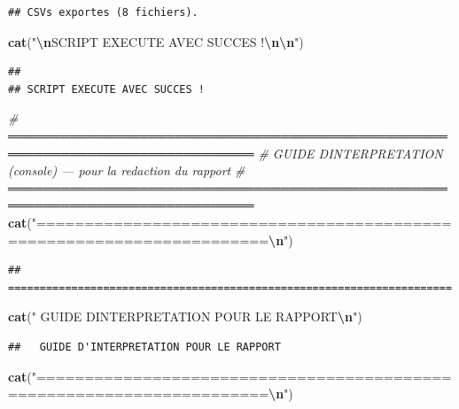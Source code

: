 \documentclass[
]{article}
\newenvironment{Shaded}{\begin{snugshade}}{\end{snugshade}}
\newcommand{\CommentTok}[1]{\textcolor[rgb]{0.56,0.35,0.01}{\textit{#1}}}
\newcommand{\FunctionTok}[1]{\textcolor[rgb]{0.13,0.29,0.53}{\textbf{#1}}}
\newcommand{\NormalTok}[1]{#1}
\newcommand{\SpecialCharTok}[1]{\textcolor[rgb]{0.81,0.36,0.00}{\textbf{#1}}}
\newcommand{\StringTok}[1]{\textcolor[rgb]{0.31,0.60,0.02}{#1}}
\begin{document}
\begin{verbatim}
## CSVs exportes (8 fichiers).
\end{verbatim}

\begin{Shaded}
\begin{Highlighting}[]
\FunctionTok{cat}\NormalTok{(}\StringTok{"}\SpecialCharTok{\textbackslash{}n}\StringTok{SCRIPT EXECUTE AVEC SUCCES !}\SpecialCharTok{\textbackslash{}n\textbackslash{}n}\StringTok{"}\NormalTok{)}
\end{Highlighting}
\end{Shaded}

\begin{verbatim}
## 
## SCRIPT EXECUTE AVEC SUCCES !
\end{verbatim}

\begin{Shaded}
\begin{Highlighting}[]
\CommentTok{\# ══════════════════════════════════════════════════════════════════════════════}
\CommentTok{\#  GUIDE D\textquotesingle{}INTERPRETATION (console) — pour la redaction du rapport}
\CommentTok{\# ══════════════════════════════════════════════════════════════════════════════}
\FunctionTok{cat}\NormalTok{(}\StringTok{"======================================================================}\SpecialCharTok{\textbackslash{}n}\StringTok{"}\NormalTok{)}
\end{Highlighting}
\end{Shaded}

\begin{verbatim}
## ======================================================================
\end{verbatim}

\begin{Shaded}
\begin{Highlighting}[]
\FunctionTok{cat}\NormalTok{(}\StringTok{"  GUIDE D\textquotesingle{}INTERPRETATION POUR LE RAPPORT}\SpecialCharTok{\textbackslash{}n}\StringTok{"}\NormalTok{)}
\end{Highlighting}
\end{Shaded}

\begin{verbatim}
##   GUIDE D'INTERPRETATION POUR LE RAPPORT
\end{verbatim}

\begin{Shaded}
\begin{Highlighting}[]
\FunctionTok{cat}\NormalTok{(}\StringTok{"======================================================================}\SpecialCharTok{\textbackslash{}n}\StringTok{"}\NormalTok{)}
\end{Highlighting}
\end{Shaded}
\end{document}
